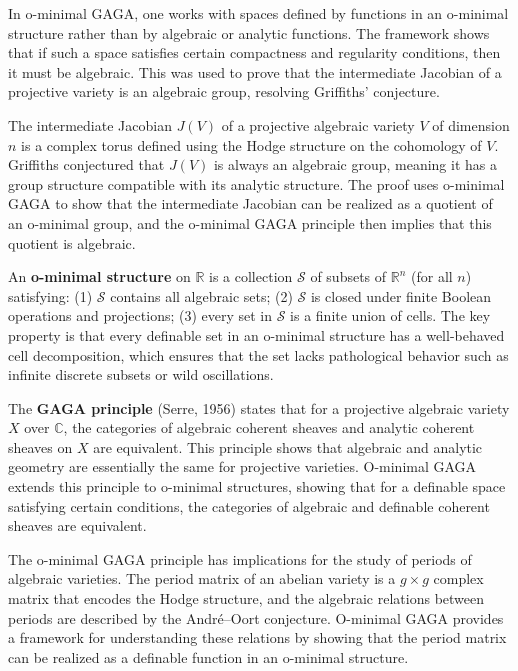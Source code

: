 In o-minimal GAGA, one works with spaces defined by functions in an o-minimal structure rather than by algebraic or analytic functions. The framework shows that if such a space satisfies certain compactness and regularity conditions, then it must be algebraic. This was used to prove that the intermediate Jacobian of a projective variety is an algebraic group, resolving Griffiths' conjecture.

The intermediate Jacobian $J(V)$ of a projective algebraic variety $V$ of dimension $n$ is a complex torus defined using the Hodge structure on the cohomology of $V$. Griffiths conjectured that $J(V)$ is always an algebraic group, meaning it has a group structure compatible with its analytic structure. The proof uses o-minimal GAGA to show that the intermediate Jacobian can be realized as a quotient of an o-minimal group, and the o-minimal GAGA principle then implies that this quotient is algebraic.

An \textbf{o-minimal structure} on $\mathbb{R}$ is a collection $\mathcal{S}$ of subsets of $\mathbb{R}^n$ (for all $n$) satisfying: (1) $\mathcal{S}$ contains all algebraic sets; (2) $\mathcal{S}$ is closed under finite Boolean operations and projections; (3) every set in $\mathcal{S}$ is a finite union of cells. The key property is that every definable set in an o-minimal structure has a well-behaved cell decomposition, which ensures that the set lacks pathological behavior such as infinite discrete subsets or wild oscillations.

The \textbf{GAGA principle} (Serre, 1956) states that for a projective algebraic variety $X$ over $\mathbb{C}$, the categories of algebraic coherent sheaves and analytic coherent sheaves on $X$ are equivalent. This principle shows that algebraic and analytic geometry are essentially the same for projective varieties. O-minimal GAGA extends this principle to o-minimal structures, showing that for a definable space satisfying certain conditions, the categories of algebraic and definable coherent sheaves are equivalent.

The o-minimal GAGA principle has implications for the study of periods of algebraic varieties. The period matrix of an abelian variety is a $g \times g$ complex matrix that encodes the Hodge structure, and the algebraic relations between periods are described by the Andr\'{e}--Oort conjecture. O-minimal GAGA provides a framework for understanding these relations by showing that the period matrix can be realized as a definable function in an o-minimal structure.

